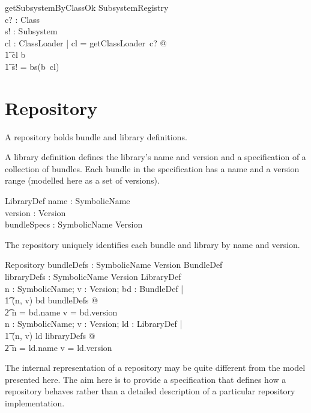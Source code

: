 \documentclass[a4paper]{article}
\begin{document}
\begin{schema}{getSubsystemByClassOk}
	\Xi SubsystemRegistry \\
	c? : Class \\
	s! : Subsystem \\
\where
	\exists cl : ClassLoader | cl = getClassLoader~c? @ \\
\t1		cl \in \dom b \land \\
\t1		s! = bs(b~cl) \\
\end{schema}

\clearpage
\section{Repository}
\label{cha:repository}

A repository holds bundle and library definitions.

A library definition defines the library's name and version and a specification of
a collection of bundles. Each bundle in the specification has a name and a version
range (modelled here as a set of versions).
\begin{schema}{LibraryDef}
 name : SymbolicName \\
 version : Version \\
 bundleSpecs : SymbolicName \pinj \power Version
\end{schema}

The repository uniquely identifies each bundle and library by name and version.
\begin{schema}{Repository}
 bundleDefs : SymbolicName \cross Version \pinj BundleDef \\
 libraryDefs : SymbolicName \cross Version \pinj LibraryDef \\
\where
 \forall n : SymbolicName; v : Version; bd : BundleDef | \\
\t1 (n, v) \mapsto bd \in bundleDefs @ \\
\t2 n = bd.name \land v = bd.version \\
 \forall n : SymbolicName; v : Version; ld : LibraryDef | \\
\t1 (n, v) \mapsto ld \in libraryDefs @ \\
\t2 n = ld.name \land v = ld.version \\
\end{schema}

The internal representation of a repository may be quite different from the
model presented here. The aim here is to provide a specification that defines
how a repository behaves rather than a detailed description of a particular
repository implementation.
\end{document}
